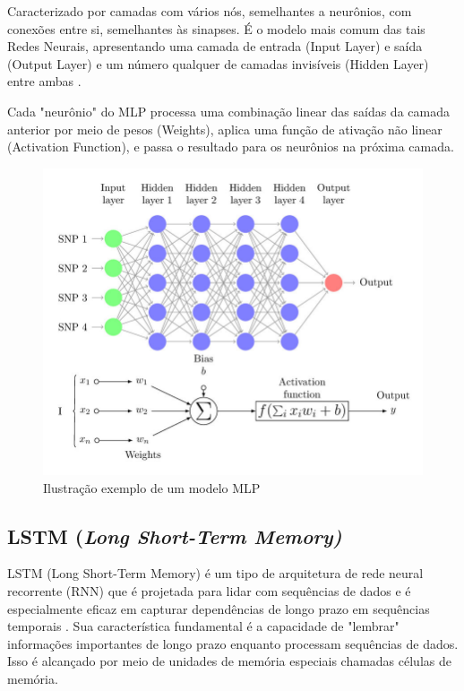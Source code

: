 Caracterizado por camadas com vários nós, semelhantes a neurônios,
com conexões entre si, semelhantes às sinapses. É o modelo mais comum das tais Redes Neurais, apresentando uma camada de entrada (Input Layer) e saída (Output Layer) e um número qualquer de camadas invisíveis (Hidden Layer) entre ambas \cite{hastie_09_elements-of.statistical-learning}.

Cada "neurônio" do MLP processa uma combinação linear das saídas da camada anterior por meio de pesos (Weights), aplica uma função de ativação não linear (Activation Function), e passa o resultado para os neurônios na próxima camada.

\begin{figure}[htb]
	\centering
	\begin{minipage}{0.9\linewidth}
		\centering
		\includegraphics[width=\linewidth]{tg1/figuras/Multi-Layer-Perceptron-MLP-diagram-with-four-hidden-layers-and-a-collection-of-single.png}
		\caption{Ilustração exemplo de um modelo MLP
            \cite{mlp_fig}} \label{fig:mlpmodel}
	\end{minipage}
\end{figure}

\subsection{\textbf{LSTM (\textit{Long Short-Term Memory) }}}

LSTM (Long Short-Term Memory) é um tipo de arquitetura de rede neural recorrente (RNN) que é projetada para lidar com sequências de dados e é especialmente eficaz em capturar dependências de longo prazo em sequências temporais \cite{lstm-}. Sua característica fundamental é a capacidade de "lembrar" informações importantes de longo prazo enquanto processam sequências de dados. Isso é alcançado por meio de unidades de memória especiais chamadas células de memória.


